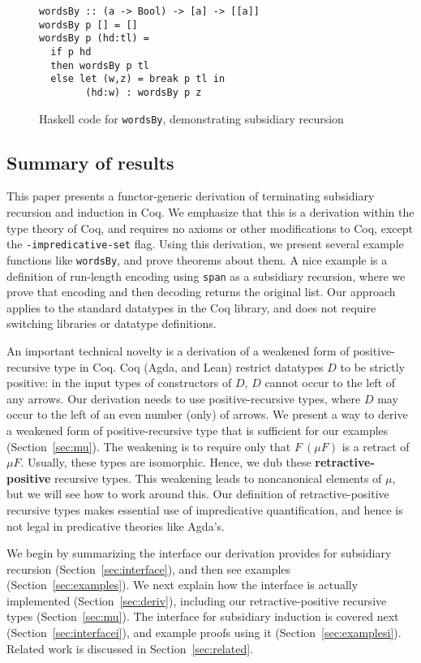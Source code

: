 \documentclass[a4paper,USenglish]{lipics-v2021}
\begin{document}
\begin{figure}
\begin{verbatim}
wordsBy :: (a -> Bool) -> [a] -> [[a]]
wordsBy p [] = []
wordsBy p (hd:tl) =
  if p hd
  then wordsBy p tl 
  else let (w,z) = break p tl in
        (hd:w) : wordsBy p z
\end{verbatim}
\caption{Haskell code for \texttt{wordsBy}, demonstrating subsidiary recursion}
\label{fig:wordsBy}
\end{figure}

\subsection{Summary of results}

This paper presents a functor-generic derivation of terminating
subsidiary recursion and induction in Coq.  We emphasize that this is
a derivation within the type theory of Coq, and requires no axioms or
other modifications to Coq, except the \verb|-impredicative-set|
flag. Using this derivation, we present several example functions like
\verb|wordsBy|, and prove theorems about them.  A nice example is a
definition of run-length encoding using \verb|span| as a subsidiary
recursion, where we prove that encoding and then decoding returns the
original list.  Our approach applies to the standard datatypes in the
Coq library, and does not require switching libraries or datatype
definitions.

An important technical novelty is a derivation of a weakened form of
positive-recursive type in Coq.  Coq (Agda, and Lean) restrict
datatypes $D$ to be strictly positive: in the input types of
constructors of $D$, $D$ cannot occur to the left of any arrows.  Our
derivation needs to use positive-recursive types, where $D$ may occur
to the left of an even number (only) of arrows.  We present a way to
derive a weakened form of positive-recursive type that is sufficient
for our examples (Section~\ref{sec:mu}).  The weakening is to require
only that $F\ (\mu F)$ is a retract of $\mu F$.  Usually, these types are
isomorphic.  Hence, we dub these \textbf{retractive-positive}
recursive types.  This weakening leads to noncanonical elements of
$\mu$, but we will see how to work around this.  Our definition of
retractive-positive recursive types makes essential use of
impredicative quantification, and hence is not legal in predicative
theories like Agda's.

We begin by summarizing the interface our derivation provides for
subsidiary recursion (Section~\ref{sec:interface}), and then see
examples (Section~\ref{sec:examples}).  We next explain how the
interface is actually implemented (Section~\ref{sec:deriv}), including
our retractive-positive recursive types (Section~\ref{sec:mu}).  The
interface for subsidiary induction is covered next
(Section~\ref{sec:interfacei}), and example proofs using it
(Section~\ref{sec:examplesi}).  Related work is discussed in
Section~\ref{sec:related}.
\end{document}
